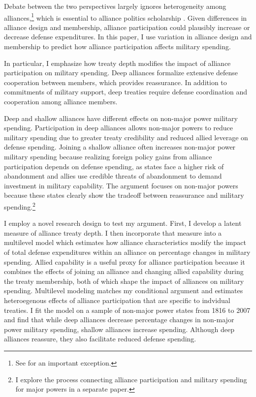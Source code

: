 \documentclass[12pt]{article}
\begin{document}
Debate between the two perspectives largely ignores heterogeneity among alliances,\footnote{See \citet{DigiuseppePoast2016} for an important exception.} which is essential to alliance politics scholarship \citep{Morrow1991, Leeds2003, LeedsAnac2005, Fordham2010, Mattes2012, Benson2012, Poast2013, Johnsonetal2015}.  
Given differences in alliance design and membership, alliance participation could plausibly increase or decrease defense expenditures. 
In this paper, I use variation in alliance design and membership to predict how alliance participation affects military spending. 


In particular, I emphasize how treaty depth modifies the impact of alliance participation on military spending. 
Deep alliances formalize extensive defense cooperation between members, which provides reassurance. 
In addition to commitments of military support, deep treaties require defense coordination and cooperation among alliance members. 


Deep and shallow alliances have different effects on non-major power military spending. 
Participation in deep alliances allows non-major powers to reduce military spending due to greater treaty credibility and reduced allied leverage on defense spending. 
Joining a shallow alliance often increases non-major power military spending because realizing foreign policy gains from alliance participation depends on defense spending, as states face a higher risk of abandonment and allies use credible threats of abandonment to demand investment in military capability.
The argument focuses on non-major powers because these states clearly show the tradeoff between reassurance and military spending.\footnote{I explore the process connecting alliance participation and military spending for major powers in a separate paper.} 
 

I employ a novel research design to test my argument.
First, I develop a latent measure of alliance treaty depth. 
I then incorporate that measure into a multilevel model which estimates how alliance characteristics modify the impact of total defense expenditures within an alliance on percentage changes in military spending.
Allied capability is a useful proxy for alliance participation because it combines the effects of joining an alliance and changing allied capability during the treaty membership, both of which shape the impact of alliances on military spending. 
Multilevel modeling matches my conditional argument and estimates heteroegenous effects of alliance participation that are specific to indvidual treaties. 
I fit the model on a sample of non-major power states from 1816 to 2007 and find that while deep alliances decrease percentage changes in non-major power military spending, shallow alliances increase spending.
Although deep alliances reassure, they also facilitate reduced defense spending. 
\end{document}
